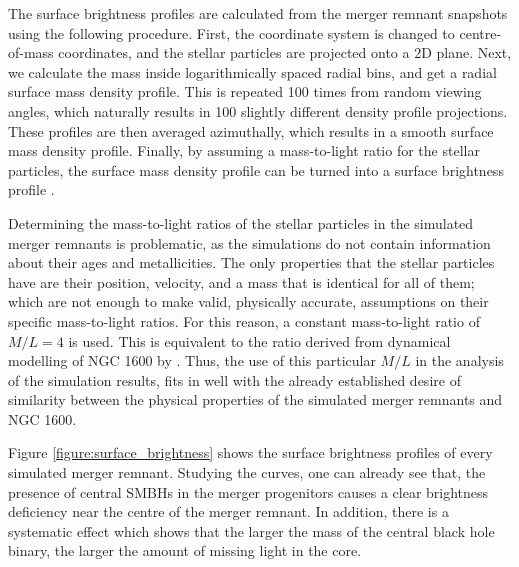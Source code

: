 \documentclass[english, oneside]{HYgradu}
\begin{document}
The surface brightness profiles are calculated from the merger remnant snapshots using the following procedure. First, the coordinate system is changed to centre-of-mass coordinates, and the stellar particles are projected onto a 2D plane. Next, we calculate the mass inside logarithmically spaced radial bins, and get a radial surface mass density profile. This is repeated 100 times from random viewing angles, which naturally results in 100 slightly different density profile projections. These profiles are then averaged azimuthally, which results in a smooth surface mass density profile. Finally, by assuming a mass-to-light ratio for the stellar particles, the surface mass density profile can be turned into a surface brightness profile \citep{Rantala2018}. 

Determining the mass-to-light ratios of the stellar particles in the simulated merger remnants is problematic, as the simulations do not contain information about their ages and metallicities. The only properties that the stellar particles have are their position, velocity, and a mass that is identical for all of them; which are not enough to make valid, physically accurate, assumptions on their specific mass-to-light ratios. For this reason, a constant mass-to-light ratio of $M/L = 4$ is used. This is equivalent to the ratio derived from dynamical modelling of NGC 1600 by \cite{Thomas2016}. Thus, the use of this particular $M/L$ in the analysis of the simulation results, fits in well with the already established desire of similarity between the physical properties of the simulated merger remnants and NGC 1600.

Figure \ref{figure:surface_brightness} shows the surface brightness profiles of every simulated merger remnant. Studying the curves, one can already see that, the presence of central SMBHs in the merger progenitors causes a clear brightness deficiency near the centre of the merger remnant. In addition, there is a systematic effect which shows that the larger the mass of the central black hole binary, the larger the amount of missing light in the core.
\end{document}
